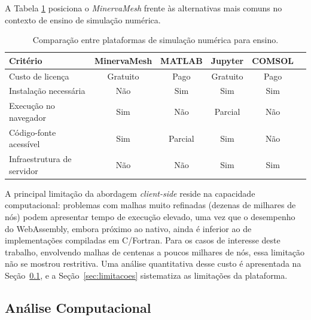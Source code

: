A Tabela \ref{tab:comparacao_plataformas} posiciona o \textit{MinervaMesh} frente às alternativas mais comuns no contexto de ensino de simulação numérica.

\begin{table}[H]
\centering
\caption{Comparação entre plataformas de simulação numérica para ensino.}
\label{tab:comparacao_plataformas}
\begin{tabular}{lccccc}
\hline
\textbf{Critério} & \textbf{MinervaMesh} & \textbf{MATLAB} & \textbf{Jupyter} & \textbf{COMSOL} \\
\hline
Custo de licença           & Gratuito & Pago       & Gratuito   & Pago \\
Instalação necessária      & Não      & Sim        & Sim        & Sim \\
Execução no navegador      & Sim      & Não        & Parcial    & Não \\
Código-fonte acessível     & Sim      & Parcial    & Sim        & Não \\
Infraestrutura de servidor & Não      & Não        & Sim        & Sim \\
\hline
\end{tabular}
\end{table}

A principal limitação da abordagem \textit{client-side} reside na capacidade computacional: problemas com malhas muito refinadas (dezenas de milhares de nós) podem apresentar tempo de execução elevado, uma vez que o desempenho do WebAssembly, embora próximo ao nativo, ainda é inferior ao de implementações compiladas em C/Fortran. Para os casos de interesse deste trabalho, envolvendo malhas de centenas a poucos milhares de nós, essa limitação não se mostrou restritiva. Uma análise quantitativa desse custo é apresentada na Seção~\ref{sec:analise_computacional}, e a Seção~\ref{sec:limitacoes} sistematiza as limitações da plataforma.

\subsection{Análise Computacional}
\label{sec:analise_computacional}

